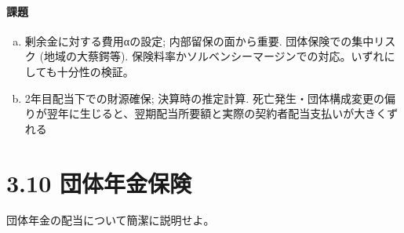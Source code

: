 \documentclass[report,gutter=10mm,fore-edge=10mm,uplatex,dvipdfmx]{jlreq}
\begin{document}
\paragraph{課題}

\begin{enumerate} [(a)]
 \item 剰余金に対する費用αの設定; 内部留保の面から重要. 団体保険での集中リスク (地域の大蔡鍔等). 保険料率かソルベンシーマージンでの対応。いずれにしても十分性の検証。
 \item 2年目配当下での財源確保; 決算時の推定計算. 死亡発生・団体構成変更の偏りが翌年に生じると、翌期配当所要額と実際の契約者配当支払いが大きくずれる
\end{enumerate}


\section{3.10 団体年金保険}
団体年金の配当について簡潔に説明せよ。
\end{document}
